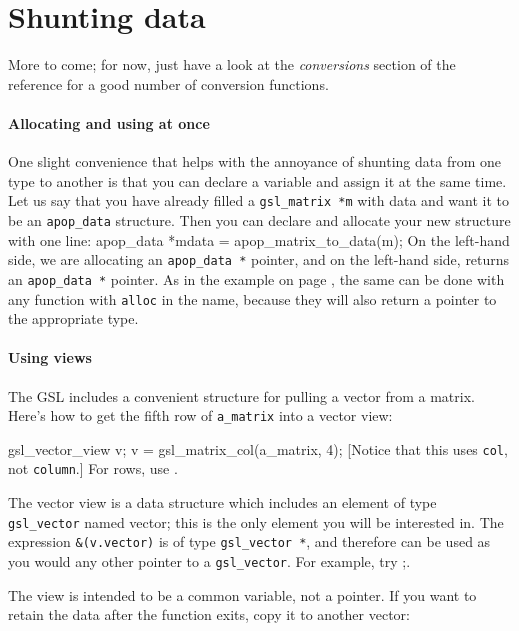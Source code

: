 \section{Shunting data} \label{asst_conversions}  

More to come; for now, just have a look at the {\sl conversions} section
of the reference for a good number of conversion functions.

\paragraph{Allocating and using at once}    
One slight convenience that helps with the annoyance of shunting data from
one type to another is that you can declare a variable and assign it at the
same time. Let us say that you have already filled a {\tt gsl\_\-matrix
*m} with data and want it to be an {\tt apop\_\-data} structure. Then
you can declare and allocate your new structure with one line:
apop_data   *mdata  = apop_matrix_to_data(m);
On the left-hand side, we are allocating an {\tt apop\_\-data *} pointer, and
on the left-hand side,  returns an 
{\tt apop\_\-data *} pointer. As in the example on page \pageref{gslexample}, the same can be
done with any function with {\tt alloc} in the name, because they will also
return a pointer to the appropriate type.

\paragraph{Using views}
The GSL includes a convenient structure for pulling a vector from a
matrix. Here's how to get the fifth row of {\tt a\_matrix} into a vector view:

gsl_vector_view v;
v = gsl_matrix_col(a_matrix, 4);
[Notice that this uses {\tt col}, not {\tt column}.]
For rows, use . 

The vector view is a data structure which includes an element of type {\tt gsl\_vector}
named vector; this is the only element you will be interested in. The
expression {\tt \&(v.vector)} is of type {\tt gsl\_vector *}, and therefore can
be used as you would any other pointer to a {\tt gsl\_vector}. For example,
try ;.

The view is intended to be a common variable, not a pointer. If you want
to retain the data after the function exits, copy it to another vector:

